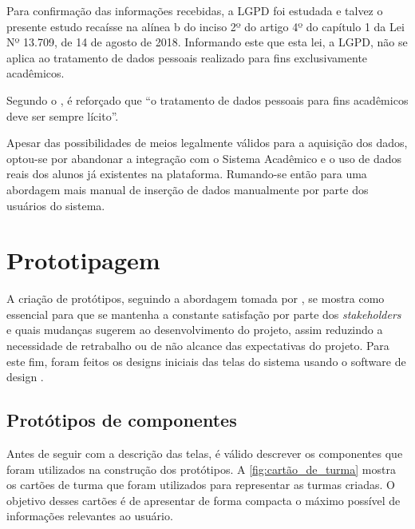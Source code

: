 Para confirmação das informações recebidas, a LGPD foi estudada e talvez o presente estudo recaísse na alínea b do inciso 2º do artigo 4º do capítulo 1 da Lei Nº 13.709, de 14 de agosto de 2018. Informando este que esta lei, a LGPD, não se aplica ao tratamento de dados pessoais realizado para fins exclusivamente acadêmicos.

Segundo o , é reforçado que ``o tratamento de dados pessoais para fins acadêmicos deve ser sempre lícito''.

Apesar das possibilidades de meios legalmente válidos para a aquisição dos dados, optou-se por abandonar a integração com o Sistema Acadêmico e o uso de dados reais dos alunos já existentes na plataforma. Rumando-se então para uma abordagem mais manual de inserção de dados manualmente por parte dos usuários do sistema.

\section{Prototipagem} \label{sec:prototipagem} %

A criação de protótipos, seguindo a abordagem tomada por , se mostra como essencial para que se mantenha a constante satisfação por parte dos \textit{stakeholders} e quais mudanças sugerem ao desenvolvimento do projeto, assim reduzindo a necessidade de retrabalho ou de não alcance das expectativas do projeto. Para este fim, foram feitos os designs iniciais das telas do sistema usando o software de design .

\subsection{Protótipos de componentes} \label{subsec:componentes} %

Antes de seguir com a descrição das telas, é válido descrever os componentes que foram utilizados na construção dos protótipos. A \autoref{fig:cartão_de_turma} mostra os cartões de turma que foram utilizados para representar as turmas criadas. O objetivo desses cartões é de apresentar de forma compacta o máximo possível de informações relevantes ao usuário.

